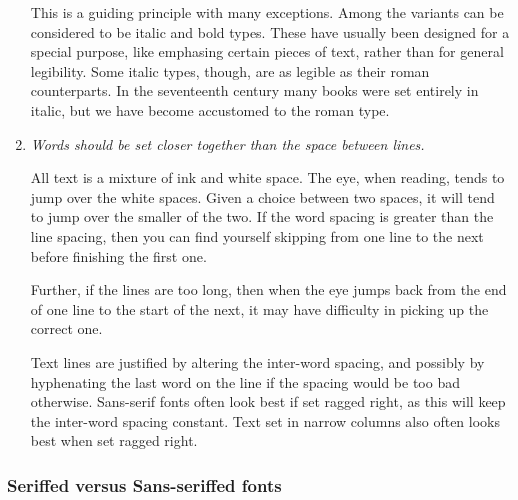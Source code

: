 \documentclass[10pt,a4paper,extrafontsizes]{memoir}
\begin{document}
\begin{paracol}{2}
\begin{enumerate}
    This is a guiding principle with many exceptions. Among the variants
can be considered to be italic and bold types. These have usually been
designed for a special purpose, like emphasing 
certain pieces of text, rather
than for general legibility. Some italic types, though, are as legible as their
roman counterparts. In the seventeenth century many books were set entirely
in italic, but we have become accustomed to the roman type.

\item \emph{Words should be set closer together than the space between lines.}

    All text is a mixture of ink and white space. The eye, when reading, 
tends to jump over the white spaces. Given a choice between two spaces, it 
will tend to jump over the smaller of the two. If the word spacing is greater
than the line spacing, then you can find yourself skipping from one line
to the next before finishing the first one.

    Further, if the lines are too long, then when the eye jumps back from
the end of one line to the start of the next, it may have difficulty in 
picking up the correct one.

    Text lines are justified by altering the inter-word spacing, and possibly
by hyphenating the last word on the line if the spacing would be too bad
otherwise. Sans-serif fonts often look best if set ragged right, as this will
keep the inter-word spacing constant. Text set in narrow 
columns also often
looks best when set ragged right.

\end{enumerate}
\end{paracol}


\subsubsection{Seriffed versus Sans-seriffed fonts}
\end{document}
